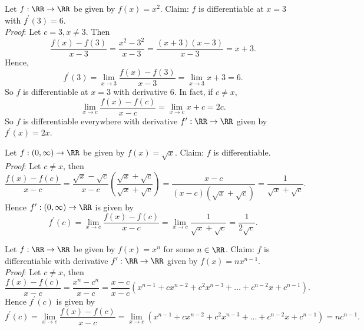 \documentclass[../real_analysis.tex]{subfiles}
\begin{document}
            \begin{example}
                Let $f:\RR\to\RR$ be given by $f(x)=x^2$. Claim: $f$ is differentiable at $x=3$ with $f^\prime(3)=6$.\\
                \textit{Proof}: Let $c=3, x\neq3$. Then
                \begin{equation}
                    \frac{f(x)-f(3)}{x-3}=\frac{x^2-3^2}{x-3}=\frac{(x+3)(x-3)}{x-3}=x+3.
                \end{equation}
                Hence,
                \begin{equation}
                    f^\prime(3)=\lim_{x\to3}\frac{f(x)-f(3)}{x-3}=\lim_{x\to3}x+3=6.
                \end{equation}
                So $f$ is differentiable at $x=3$ with derivative 6. In fact, if $c\neq x$,
                \begin{equation}
                    \lim_{x\to c}\frac{f(x)-f(c)}{x-c}=\lim_{x\to c}x+c=2c.
                \end{equation}
                So $f$ is differentiable everywhere with derivative $f^\prime:\RR\to\RR$ given by $f^\prime(x)=2x$.
            \end{example}
            \begin{example}
                Let $f:(0,\infty)\to\RR$ be given by $f(x)=\sqrt{x}$. Claim: $f$ is differentiable.\\
                \textit{Proof}: Let $c\neq x$, then
                \begin{equation}
                    \frac{f(x)-f(c)}{x-c}=\frac{\sqrt{x}-\sqrt{c}}{x-c}\left(\frac{\sqrt{x}+\sqrt{c}}{\sqrt{x}+\sqrt{c}}\right)=\frac{x-c}{(x-c)(\sqrt{x}+\sqrt{c})}=\frac{1}{\sqrt{x}+\sqrt{c}}.
                \end{equation}
                Hence $f^\prime:(0,\infty)\to\RR$ is given by
                \begin{equation}
                    f^\prime(c)=\lim_{x\to c}\frac{f(x)-f(c)}{x-c}=\lim_{x\to c}\frac{1}{\sqrt{x}+\sqrt{c}}=\frac{1}{2\sqrt{c}}.
                \end{equation}
            \end{example}
            \begin{example}
                Let $f:\RR\to\RR$ be given by $f(x)=x^n$ for some $n\in\RR$. Claim: $f$ is differentiable with derivative $f^\prime:\RR\to\RR$ given by $f(x)=nx^{n-1}$.\\
                \textit{Proof}: Let $c\neq x$, then
                \begin{equation}
                    \frac{f(x)-f(c)}{x-c}=\frac{x^n-c^n}{x-c}=\frac{x-c}{x-c}(x^{n-1}+cx^{n-2}+c^2x^{n-3}+\dots+c^{n-2}x+c^{n-1}).
                \end{equation}
                Hence $f^\prime(c)$ is given by
                \begin{equation}
                    f^\prime(c)=\lim_{x\to c}\frac{f(x)-f(c)}{x-c}=\lim_{x\to c}(x^{n-1}+cx^{n-2}+c^2x^{n-3}+\dots+c^{n-2}x+c^{n-1})=nc^{n-1}.
                \end{equation}
            \end{example}
\end{document}
